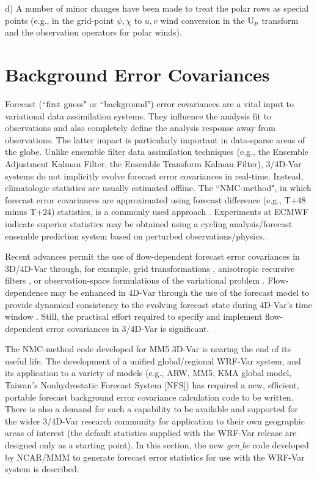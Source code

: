 d) A number of minor changes have been made to treat the polar rows as special points 
(e.g., in the grid-point $\psi, \chi$ to $u,v$ wind conversion in the ${\rm U}_p$ transform and the 
observation operators for polar winds).

\section{Background Error Covariances}
\label{var-be}

Forecast (``first guess" or ``background") error covariances are a vital input to variational 
data assimilation systems. They influence the analysis fit to observations and also 
completely define the analysis response away from observations. The latter impact is 
particularly important in data-sparse areas of the globe. Unlike ensemble filter data 
assimilation techniques (e.g., the Ensemble Adjustment Kalman Filter, the Ensemble 
Transform Kalman Filter), 3/4D-Var systems do not implicitly evolve forecast error 
covariances in real-time. Instead, climatologic statistics are usually estimated offline. 
The ``NMC-method", in which forecast error covariances are approximated using 
forecast difference (e.g., T+48 minus T+24) statistics, is a commonly used approach 
\citep{parrish92}. Experiments at ECMWF \citep{fisher03} indicate superior statistics may 
be obtained using a cycling analysis/forecast ensemble prediction
system based on perturbed observations/physics.

Recent advances permit the use of flow-dependent forecast error
covariances in 3D/4D-Var through, for example, grid transformations
\citep{desroziers97}, anisotropic recursive filters
\citep{wu02, purser03},
or observation-space formulations of the variational 
problem \citep{daley01}. Flow-dependence may be enhanced in 4D-Var 
through the use of the forecast model to provide dynamical consistency to the evolving 
forecast state during 4D-Var's time window \citep{rabier98}. Still, the practical effort 
required to specify and implement flow-dependent error covariances in 3/4D-Var is 
significant.

The NMC-method code developed for MM5 3D-Var \citep{barker04} is nearing the 
end of its useful life. The development of a unified global/regional WRF-Var system, and 
its application to a variety of models (e.g., ARW, MM5, KMA global model, 
Taiwan's Nonhydrostatic Forecast System [NFS]) has 
required a new, efficient, portable forecast background error covariance calculation 
code to be written. There is also a demand for such a capability to be available and 
supported for the wider 3/4D-Var research community for application to their own 
geographic areas of interest (the default statistics supplied with the WRF-Var 
release are designed only as a starting point). In this section, the new {\it gen$\_$be} code 
developed by NCAR/MMM to generate forecast error statistics for use with the 
WRF-Var system is described.

